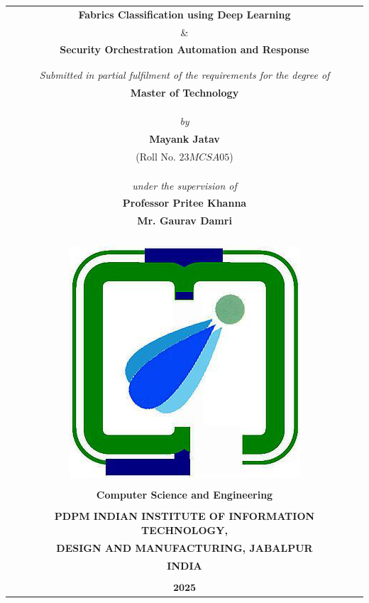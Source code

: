
\begin{titlepage}
\thispagestyle{empty}


\begin{table}
	\centering
	\begin{tabular}{c}
		\Large \textbf{Fabrics Classification using Deep Learning} \\
		\& \\
		\Large \textbf{Security Orchestration Automation and Response} \\
		\\
		\\
		\it Submitted in partial fulfilment of the requirements for the degree of	\\
		\bf Master of Technology	\\
		\\
		\\
		\\
		\it by	\\
		\large \bf {Mayank Jatav}	\\
		(Roll No. $23MCSA05$)	\\
		\\
		\\
		\\
		\it under the supervision of	\\
		\large \bf Professor Pritee Khanna	\\
		\large \bf Mr. Gaurav Damri \\

		\\
		\\
		\\
		\\
		\includegraphics[width=.17\textwidth]{images/iiitdmj.png}	\\
		\\
		\normalsize{\textbf{Computer Science and Engineering}}	\\
		\\
		\bf PDPM INDIAN INSTITUTE OF INFORMATION TECHNOLOGY,	\\
		\bf DESIGN AND MANUFACTURING, JABALPUR	\\
		\bf INDIA	\\
		\\
		$\mathbf{2025}$	\\
	\end{tabular}
\end{table}
\pagebreak


\thispagestyle{empty}
\end{titlepage}

